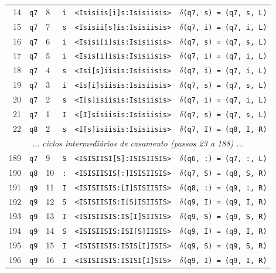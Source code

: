 \begin{table}[t]
\begin{tabularx}{\textwidth}{@{}rllllX@{}}
14 & \texttt{q7} & 8 & \texttt{i} & \texttt{<Isisiis[i]s:Isisiisis>} & \texttt{$\delta$(q7, s) = (q7, s, L)} \\
15 & \texttt{q7} & 7 & \texttt{s} & \texttt{<Isisii[s]is:Isisiisis>} & \texttt{$\delta$(q7, i) = (q7, i, L)} \\
16 & \texttt{q7} & 6 & \texttt{i} & \texttt{<Isisi[i]sis:Isisiisis>} & \texttt{$\delta$(q7, s) = (q7, s, L)} \\
17 & \texttt{q7} & 5 & \texttt{i} & \texttt{<Isis[i]isis:Isisiisis>} & \texttt{$\delta$(q7, i) = (q7, i, L)} \\
18 & \texttt{q7} & 4 & \texttt{s} & \texttt{<Isi[s]iisis:Isisiisis>} & \texttt{$\delta$(q7, i) = (q7, i, L)} \\
19 & \texttt{q7} & 3 & \texttt{i} & \texttt{<Is[i]siisis:Isisiisis>} & \texttt{$\delta$(q7, s) = (q7, s, L)} \\
20 & \texttt{q7} & 2 & \texttt{s} & \texttt{<I[s]isiisis:Isisiisis>} & \texttt{$\delta$(q7, i) = (q7, i, L)} \\
21 & \texttt{q7} & 1 & \texttt{I} & \texttt{<[I]sisiisis:Isisiisis>} & \texttt{$\delta$(q7, s) = (q7, s, L)} \\
22 & \texttt{q8} & 2 & \texttt{s} & \texttt{<I[s]isiisis:Isisiisis>} & \texttt{$\delta$(q7, I) = (q8, I, R)} \\
\multicolumn{6}{c}{\textit{... ciclos intermediários de casamento (passos 23 a 188) ...}} \\
189 & \texttt{q7} & 9 & \texttt{S} & \texttt{<ISISIISI[S]:ISISIISIS>} & \texttt{$\delta$(q6, :) = (q7, :, L)} \\
190 & \texttt{q8} & 10 & \texttt{:} & \texttt{<ISISIISIS[:]ISISIISIS>} & \texttt{$\delta$(q7, S) = (q8, S, R)} \\
191 & \texttt{q9} & 11 & \texttt{I} & \texttt{<ISISIISIS:[I]SISIISIS>} & \texttt{$\delta$(q8, :) = (q9, :, R)} \\
192 & \texttt{q9} & 12 & \texttt{S} & \texttt{<ISISIISIS:I[S]ISIISIS>} & \texttt{$\delta$(q9, I) = (q9, I, R)} \\
193 & \texttt{q9} & 13 & \texttt{I} & \texttt{<ISISIISIS:IS[I]SIISIS>} & \texttt{$\delta$(q9, S) = (q9, S, R)} \\
194 & \texttt{q9} & 14 & \texttt{S} & \texttt{<ISISIISIS:ISI[S]IISIS>} & \texttt{$\delta$(q9, I) = (q9, I, R)} \\
195 & \texttt{q9} & 15 & \texttt{I} & \texttt{<ISISIISIS:ISIS[I]ISIS>} & \texttt{$\delta$(q9, S) = (q9, S, R)} \\
196 & \texttt{q9} & 16 & \texttt{I} & \texttt{<ISISIISIS:ISISI[I]SIS>} & \texttt{$\delta$(q9, I) = (q9, I, R)} \\

\end{tabularx}
\end{table}

